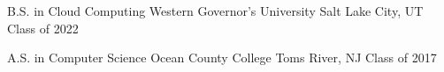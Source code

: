 

\begin{cventries}

	\cventry
	{B.S. in Cloud Computing} %
	{Western Governor's University} %
	{Salt Lake City, UT} %
	{Class of 2022} %
	{
		\begin{cvitems} %
		\end{cvitems}
	}

	\cventry
	{A.S. in Computer Science} %
	{Ocean County College} %
	{Toms River, NJ} %
	{Class of 2017} %
	{
		\begin{cvitems} %
		\end{cvitems}
	}


\end{cventries}
